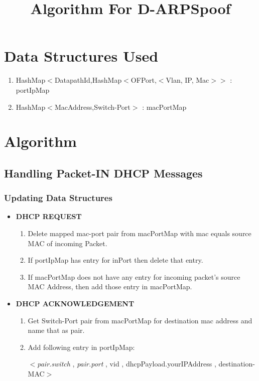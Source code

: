 \documentclass{article}
\title{Algorithm For D-ARPSpoof}
\renewcommand{\maketitle}{

	\begin{center}
		{\huge\noindent\ignorespaces\textbf{\thetitle}\par}
	\end{center}
	\vspace{0.3in}
	
}
\begin{document}
\maketitle

\section{Data Structures Used}

\begin{enumerate}
	\item HashMap$<$DatapathId,HashMap$<$OFPort,$<$Vlan, IP, Mac$>$$>$ : portIpMap
	\item HashMap$<$MacAddress,Switch-Port$>$ : macPortMap
\end{enumerate}

\section{Algorithm}


\subsection{Handling Packet-IN DHCP Messages}


\subsubsection{Updating Data Structures} \label{dhcp-ds}


\begin{itemize}
	\item \textbf{DHCP REQUEST}

		\begin{enumerate}
			\item Delete mapped mac-port pair from macPortMap with mac equals source MAC of incoming Packet.
			\item If portIpMap has entry for inPort then delete that entry.
			\item If macPortMap does not have any entry for incoming packet's source MAC Address, then add those entry in macPortMap.
		\end{enumerate}
	\item \textbf{DHCP ACKNOWLEDGEMENT} \label{dhcp-ack}
		\begin{enumerate}
			\item Get Switch-Port pair from macPortMap for destination mac address and name that as pair.
			\item Add following entry in portIpMap:

				\small{
					$<$\textit{pair.switch} ,  \textit{pair.port} , vid , dhcpPayload.yourIPAddress , destination-MAC$>$
				}
		\end{enumerate}

\end{itemize}
\end{document}
